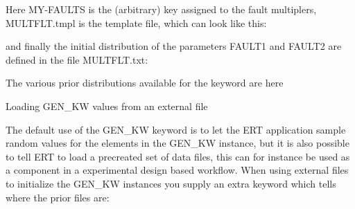 \documentclass[letterpaper,10pt,english]{sphinxmanual}
\begin{document}
\begin{sphinxShadowBox}
%
\begin{sphinxVerbatim}[commandchars=\\\{\}]
           
\end{sphinxVerbatim}

Here MY-FAULTS is the (arbitrary) key assigned to the fault multiplers,
MULTFLT.tmpl is the template file, which can look like this:

%
\begin{sphinxVerbatim}[commandchars=\\\{\}]
      
      
\end{sphinxVerbatim}

and finally the initial distribution of the parameters FAULT1 and FAULT2 are
defined in the file MULTFLT.txt:

%
\begin{sphinxVerbatim}[commandchars=\\\{\}]
         
            
\end{sphinxVerbatim}

The various prior distributions available for the 
keyword are here 

Loading GEN\_KW values from an external file

The default use of the GEN\_KW keyword is to let the ERT application sample
random values for the elements in the GEN\_KW instance, but it is also possible
to tell ERT to load a precreated set of data files, this can for instance be
used as a component in a experimental design based workflow. When using
external files to initialize the GEN\_KW instances you supply an extra keyword
 which tells where the prior files are:

%
\begin{sphinxVerbatim}[commandchars=\\\{\}]
               
\end{sphinxVerbatim}


\end{sphinxShadowBox}
\end{document}
